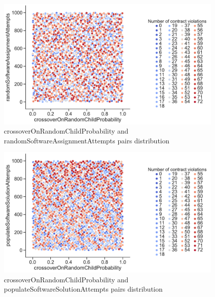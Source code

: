 \begin{figure}
	\centering
	\includegraphics[width=\textwidth]{images/PairsDistr/crossoverOnRandomChildProbability_randomSoftwareAssignmentAttempts.pdf}
	\caption[crossoverOnRandomChildProbability and randomSoftwareAssignmentAttempts pairs distribution]{crossoverOnRandomChildProbability and randomSoftwareAssignmentAttempts pairs distribution}
	\label{fig:crossoverOnRandomChildProbability_randomSoftwareAssignmentAttempts_pair}
\end{figure}
\begin{figure}
	\centering
	\includegraphics[width=\textwidth]{images/PairsDistr/crossoverOnRandomChildProbability_populateSoftwareSolutionAttempts.pdf}
	\caption[crossoverOnRandomChildProbability and populateSoftwareSolutionAttempts pairs distribution]{crossoverOnRandomChildProbability and populateSoftwareSolutionAttempts pairs distribution}
	\label{fig:crossoverOnRandomChildProbability_populateSoftwareSolutionAttempts_pair}
\end{figure}

